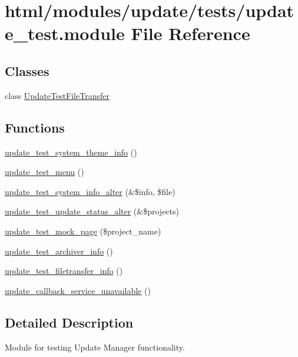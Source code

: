 \hypertarget{update__test_8module}{
\section{html/modules/update/tests/update\_\-test.module File Reference}
\label{update__test_8module}
}
\subsection*{Classes}
\begin{DoxyCompactItemize}
\item 
class \hyperlink{classUpdateTestFileTransfer}{UpdateTestFileTransfer}
\end{DoxyCompactItemize}
\subsection*{Functions}
\begin{DoxyCompactItemize}
\item 
\hyperlink{update__test_8module_a1bb6e769b5cda51dd3ef92371eaae330}{update\_\-test\_\-system\_\-theme\_\-info} ()
\item 
\hyperlink{update__test_8module_a65e97dbd4657523edc1297af8ddc1f51}{update\_\-test\_\-menu} ()
\item 
\hyperlink{update__test_8module_affa94787d8b78916e1f9625114d8f15f}{update\_\-test\_\-system\_\-info\_\-alter} (\&\$info, \$file)
\item 
\hyperlink{update__test_8module_a0a00098ba4eca8497f9144d6ea6f9160}{update\_\-test\_\-update\_\-status\_\-alter} (\&\$projects)
\item 
\hyperlink{update__test_8module_a6eed92d3171b2d720e224dc09979fe59}{update\_\-test\_\-mock\_\-page} (\$project\_\-name)
\item 
\hyperlink{update__test_8module_a17d36d1dea641f2164236e67bdf55ba9}{update\_\-test\_\-archiver\_\-info} ()
\item 
\hyperlink{update__test_8module_a3d75c6d974fa7f93b4d757a82770b0d6}{update\_\-test\_\-filetransfer\_\-info} ()
\item 
\hyperlink{update__test_8module_ad70dd907c5b546384b07f9e582764151}{update\_\-callback\_\-service\_\-unavailable} ()
\end{DoxyCompactItemize}


\subsection{Detailed Description}
Module for testing Update Manager functionality. 

